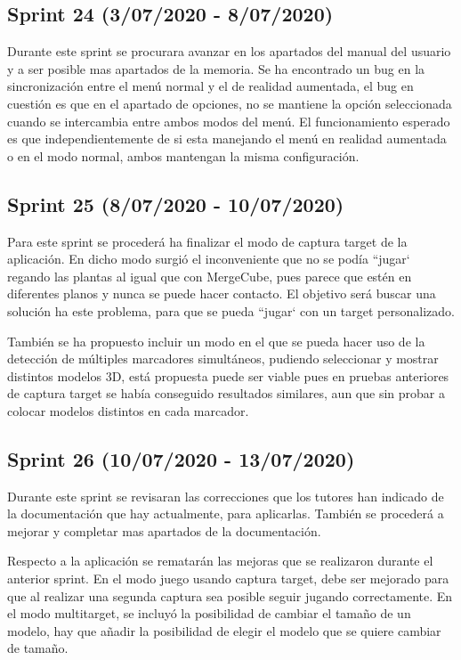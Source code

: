 \subsection{Sprint 24 (3/07/2020 - 8/07/2020)} 
 Durante este sprint se procurara avanzar en los apartados del manual del usuario y a ser posible mas apartados de la memoria.
 Se ha encontrado un bug en la sincronización entre el menú normal y el de realidad aumentada, el bug en cuestión es que en el apartado de opciones, no se mantiene la opción seleccionada cuando se intercambia entre ambos modos del menú. El funcionamiento esperado es que independientemente de si esta manejando el menú en realidad aumentada o en el modo normal, ambos mantengan la misma configuración.
 
 \subsection{Sprint 25 (8/07/2020 - 10/07/2020)} 
 Para este sprint se procederá ha finalizar el modo de captura target de la aplicación. En dicho modo surgió el inconveniente que no se podía ``jugar` regando las plantas al igual que con  MergeCube, pues parece que estén en diferentes planos y nunca se puede hacer contacto. El objetivo será buscar una solución ha este problema, para que se pueda ``jugar`  con un target personalizado. 
 
 También se ha propuesto incluir un modo en el que se pueda hacer uso de la detección de múltiples marcadores simultáneos, pudiendo seleccionar y mostrar distintos modelos 3D, está propuesta puede ser viable pues en pruebas anteriores de captura target se había conseguido resultados similares, aun que sin probar a colocar modelos distintos en cada marcador.

 \subsection{Sprint 26 (10/07/2020 - 13/07/2020)} 
 Durante este sprint se revisaran las correcciones que los tutores han  indicado de la documentación que hay actualmente, para aplicarlas. También se procederá a mejorar y completar mas apartados de la documentación.
 
 Respecto a la aplicación se rematarán las mejoras que se realizaron durante el anterior sprint. En el modo juego usando captura target, debe ser mejorado para que al realizar una segunda captura sea posible seguir jugando correctamente. En el modo multitarget, se incluyó la posibilidad de cambiar el tamaño de un modelo, hay que añadir la posibilidad de elegir el modelo que se quiere cambiar de tamaño. 
 
